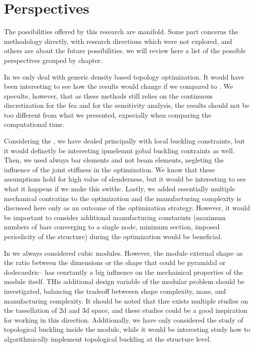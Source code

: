 \section*{Perspectives}
The possibilities offered by this research are manifold. Some part concerns the methodology directly, with
research directions which were not explored, and others are about the future possibilities. we will review here a list of the possible perspectives grouped by chapter. 

In \chpref{} we only deal with generic density based topology optimization. It would have been interesting to see how the results would change if we compared to . We speculte, however, that as these methods still relies on the continuous discretization for the fea and for the sensitivity analysis, the results should not be too different from what we presented, expecially when comparing the computational time.

Considering the \chpref{}, we have dealed principally with local buckling constraints, but it would definetly be interesting ipmelemnt gobal buckling contraints as well. Then, we used always bar elements and not beam elements, negleting the influence of the joint stiffness in the optimization. We know that these assumptions hold for high value of slenderness, but it would be interesting to see what it happens if we make this swithc. Lastly, we added essentially multiple mechanical contratins to the optimization and the manufacturing
complexity is discussed here only as an outcome of the
optimization strategy. However, it would be important to consider additional manufacturing constarints (maximum numbers of bars converging to a single node,
minimum section, imposed periodicity of the structure) during the optimization would be beneficial. 

In \chpref{} we always considered cubic modules. However, the module external shape--as the ratio between the dimensions or the shape that could be pyramidal or dodecaedric-- has cenrtantly a big influence on the mechainical properties of the module itself. THis additional design variable of the modular problem should be investigated, balancing the tradeoff betweeen shape complexity, mass, and manufacturing complexity. It should be noted that thre exists multiple studies on the tassellation of 2d and 3d space, and these studies could be a good inspiration for working in this direction. Additionally, we have only considered the study of topological buckling inside the module, while it would be interesting study how to algorithmically implement topological buckling at the structure level.

